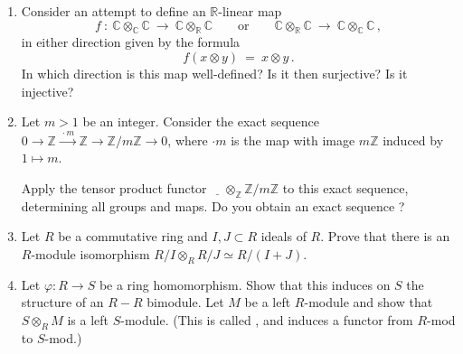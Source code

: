 \documentclass[12pt]{article}
\newcommand{\RR}{{\mathbb R}}
\newcommand{\CC}{{\mathbb C}}
\newcommand{\ZZ}{{\mathbb Z}}
\def\demph#1{{\color{blue}{\sl #1}}}
\begin{document}
\begin{enumerate}
\item   
   Consider an attempt to define an $\RR$-linear map
\[
      f\ \colon\  \CC\otimes_\CC\CC\ \longrightarrow\ \CC\otimes_\RR\CC
   \qquad\mbox{or}\qquad
     \CC\otimes_\RR\CC\ \longrightarrow\ \CC\otimes_\CC\CC\,,
\]
 in either direction given by the formula
\[
    f(x\otimes y)\ =\ x\otimes y\,.
\]
 In which direction is this map well-defined?
 Is it then surjective?
 Is it injective? 
   \vspace{-2pt}

 \item Let $m>1$ be an integer.
   Consider the exact sequence $0\to\ZZ\xrightarrow{\,\cdot m\,}\ZZ\to\ZZ/m\ZZ\to 0$, where
   $\cdot m$ is the map with image $m\ZZ$ induced by $1\mapsto m$.

   Apply the tensor product functor $\underline{\quad}\otimes_\ZZ\ZZ/m\ZZ$ to this exact sequence,
   determining all groups and maps.
   Do you obtain an exact sequence ?
   \vspace{-2pt}

 \item Let $R$ be a commutative ring and $I,J\subset R$ ideals of $R$.
   Prove that there is an $R$-module isomorphism
   $R/I\otimes_R R/J\simeq R/(I{+}J)$.
   \vspace{-2pt}

 \item Let $\varphi\colon R\to S$ be a ring homomorphism.
  Show that this induces on $S$ the structure of an $R{-}R$ bimodule.
  Let $M$ be a left $R$-module and show that $S\otimes_R M$ is a left $S$-module.
  (This is called \demph{base extension}, and induces a functor from $R$-mod to $S$-mod.)
   \vspace{-2pt}

\end{enumerate}
\end{document}
